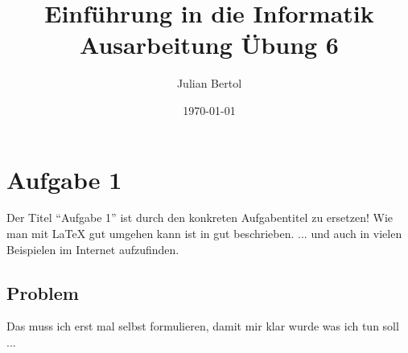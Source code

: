 \documentclass[a4paper,11pt,titlepage]{article}
\begin{document}
\title{Einf\"uhrung in die Informatik\\
Ausarbeitung \"Ubung 6}


\author{Julian Bertol}


\date{\today}

\maketitle{\thispagestyle{plain}}

\section{Aufgabe 1}
Der Titel "`Aufgabe 1"' ist durch den konkreten Aufgabentitel zu ersetzen!
Wie man mit LaTeX gut umgehen kann ist in \cite{lkurz} gut beschrieben.
... und auch in vielen Beispielen im Internet aufzufinden.

\subsection{Problem}
Das muss ich erst mal selbst formulieren, damit mir klar wurde was ich tun soll ...
\end{document}
